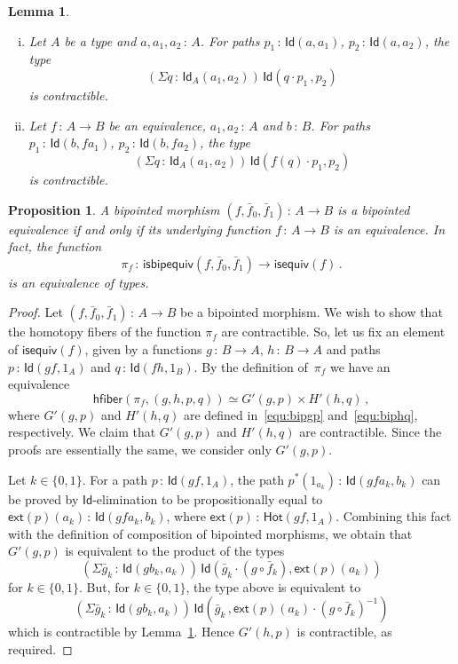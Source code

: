 \documentclass[10pt,a4paper,oneside,reqno]{amsart}
\numberwithin{equation}{section}
\theoremstyle{mythm}
\newtheorem{lemma}[theorem]{Lemma}
\newtheorem{proposition}[theorem]{Proposition}
\theoremstyle{mydef}
\theoremstyle{myrmk}
\newcommand{\co}{\,{:}\,}
\newcommand{\ct}{\cdot}
\newcommand{\hfiber}{\mathsf{hfiber}}
\newcommand{\isequiv}{\mathsf{isequiv}}
\newcommand{\Hot}{\mathsf{Hot}}
\newcommand{\ext}{\mathsf{ext}}
\newcommand{\Id}{\mathsf{Id}}
\newcommand{\isbipequiv}{\mathsf{isbipequiv}}
\begin{document}
\begin{lemma} \hfill \label{thm:useful}
\begin{enumerate}[(i)]
\item Let $A$ be a type and $a, a_1, a_2 \co A$. For paths $p_1 \co \Id(a,a_1)$, $p_2 \co \Id(a,a_2)$, the type 
\[
(\Sigma q \co \Id_A(a_1,a_2)) \, \Id( q \ct p_1 \, , p_2)
\] 
is contractible. 
\item Let $f \co A \to B$ be an equivalence, $a_1, a_2 \co A$ and $b \co B$. For paths $p_1 \co \Id(b, f a_1)$, 
$p_2 \co \Id(b, fa_2)$, the type 
\[
(\Sigma q \co \Id_A(a_1,a_2)) \, \Id(f(q) \ct p_1 , p_2)
\] 
is contractible.
\end{enumerate}
\end{lemma}




\begin{proposition}  \label{thm:usemere}  A bipointed morphism $(f, \bar{f}_0, \bar{f}_1) \co A \to B$ is a bipointed equivalence if and only
if its underlying function $f \co A \to B$ is an equivalence. In fact,  the  function
\[
\pi_f \co \isbipequiv(f, \bar{f}_0, \bar{f}_1)  \to \isequiv(f) \, .
\]
is an equivalence of types. 
\end{proposition}  

\begin{proof}
Let  $(f, \bar{f}_0, \bar{f}_1) \co A \to B$ be a bipointed morphism. We wish to show that the homotopy fibers
of the function $\pi_f$ are contractible. So, let us fix an element of $\isequiv(f)$, given by a functions $g \co B
\to A$, $h \co B \to A$ and paths $p \co \Id(gf, 1_A)$ and $q \co \Id(fh, 1_B)$. By the definition of~$\pi_f$ we have
an equivalence 
\[
\hfiber(\pi_f, (g,h, p, q)) \simeq G'(g,p) \times H'(h,q) \, ,
\]
 where $G'(g,p)$ and $H'(h,q)$ are defined
in~\eqref{equ:bipgp} and~\eqref{equ:biphq}, respectively. 
We claim that $G'(g,p)$ and $H'(h,q)$ are contractible. Since
the proofs are essentially the same, we consider only $G'(g,p)$.  

Let $k \in \{0, 1 \}$. For a path $p \co \Id(gf, 1_A)$, the path $p^*(1_{a_k}) \co \Id( gf a_k, b_k)$ can be proved by $\Id$-elimination to be propositionally equal to $\ext(p)(a_k) \co \Id(gfa_k, b_k)$, where $\ext(p) \co \Hot(gf, 1_A)$. Combining this fact with the definition of composition of bipointed morphisms, we obtain that
$G'(g,p)$ is equivalent to the product of the types
\[
(\Sigma \bar{g}_k \co \Id( gb_k, a_k)) \, \Id ( \bar{g}_k \ct (g \circ \bar{f}_k), \ext(p)(a_k))
\]
for $k \in \{0, 1 \}$. But, for $k \in \{ 0, 1 \}$, the type above is equivalent to 
\[
(\Sigma \bar{g}_k \co \Id( gb_k, a_k)) \, \Id ( \bar{g}_k \, , \ext(p)(a_k) \ct  (g \circ \bar{f}_k)^{-1} )
\]
which is contractible by Lemma~\ref{thm:useful}. Hence $G'(h,p)$ is contractible, as required.
\end{proof}
\end{document}
